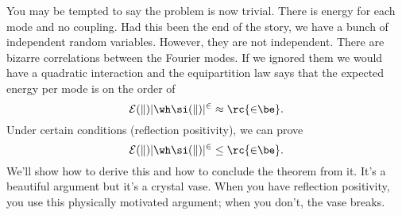 You may be tempted to say the problem is now trivial. There is energy for each mode and no coupling. Had this been the end of the story, we have a bunch of independent random variables. However, they are not independent. There are bizarre correlations between the Fourier modes. If we ignored them we would have a quadratic interaction and the equipartition law says that the expected energy per mode is on the order of 
\[
\cal E(k) |\wh \si(k)|^2 \approx \rc{2\be}.
\]
Under certain conditions (reflection positivity), we can prove
\[
\cal E(k) |\wh \si(k)|^2 \le \rc{2\be}.
\]
We'll show how to derive this and how to conclude the theorem from it. It's a beautiful argument but it's a crystal vase. When you have reflection positivity, you use this physically motivated argument; when you don't, the vase breaks.













